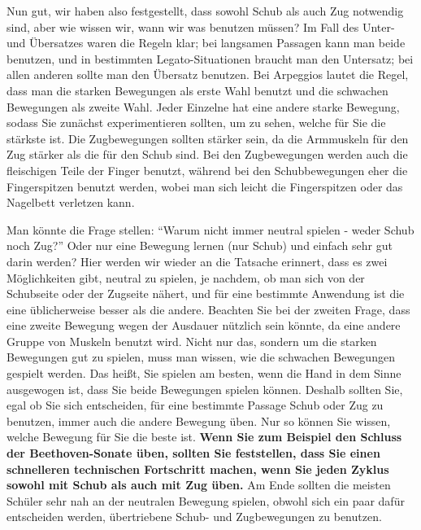 Nun gut, wir haben also festgestellt, dass sowohl Schub als auch Zug notwendig sind, aber wie wissen wir, wann wir was benutzen müssen?
Im Fall des Unter- und Übersatzes waren die Regeln klar; bei langsamen Passagen kann man beide benutzen, und in bestimmten Legato-Situationen braucht man den Untersatz; bei allen anderen sollte man den Übersatz benutzen.
Bei Arpeggios lautet die Regel, dass man die starken Bewegungen als erste Wahl benutzt und die schwachen Bewegungen als zweite Wahl.
Jeder Einzelne hat eine andere starke Bewegung, sodass Sie zunächst experimentieren sollten, um zu sehen, welche für Sie die stärkste ist.
Die Zugbewegungen sollten stärker sein, da die Armmuskeln für den Zug stärker als die für den Schub sind.
Bei den Zugbewegungen werden auch die fleischigen Teile der Finger benutzt, während bei den Schubbewegungen eher die Fingerspitzen benutzt werden, wobei man sich leicht die Fingerspitzen oder das Nagelbett verletzen kann.

Man könnte die Frage stellen: \enquote{Warum nicht immer neutral spielen - weder Schub noch Zug?}
Oder nur eine Bewegung lernen (nur Schub) und einfach sehr gut darin werden?
Hier werden wir wieder an die Tatsache erinnert, dass es zwei Möglichkeiten gibt, neutral zu spielen, je nachdem, ob man sich von der Schubseite oder der Zugseite nähert, und für eine bestimmte Anwendung ist die eine üblicherweise besser als die andere.
Beachten Sie bei der zweiten Frage, dass eine zweite Bewegung wegen der Ausdauer nützlich sein könnte, da eine andere Gruppe von Muskeln benutzt wird.
Nicht nur das, sondern um die starken Bewegungen gut zu spielen, muss man wissen, wie die schwachen Bewegungen gespielt werden.
Das heißt, Sie spielen am besten, wenn die Hand in dem Sinne ausgewogen ist, dass Sie beide Bewegungen spielen können.
Deshalb sollten Sie, egal ob Sie sich entscheiden, für eine bestimmte Passage Schub oder Zug zu benutzen, immer auch die andere Bewegung üben.
Nur so können Sie wissen, welche Bewegung für Sie die beste ist.
\textbf{Wenn Sie zum Beispiel den Schluss der Beethoven-Sonate üben, sollten Sie feststellen, dass Sie einen schnelleren technischen Fortschritt machen, wenn Sie jeden Zyklus sowohl mit Schub als auch mit Zug üben.}
Am Ende sollten die meisten Schüler sehr nah an der neutralen Bewegung spielen, obwohl sich ein paar dafür entscheiden werden, übertriebene Schub- und Zugbewegungen zu benutzen.

